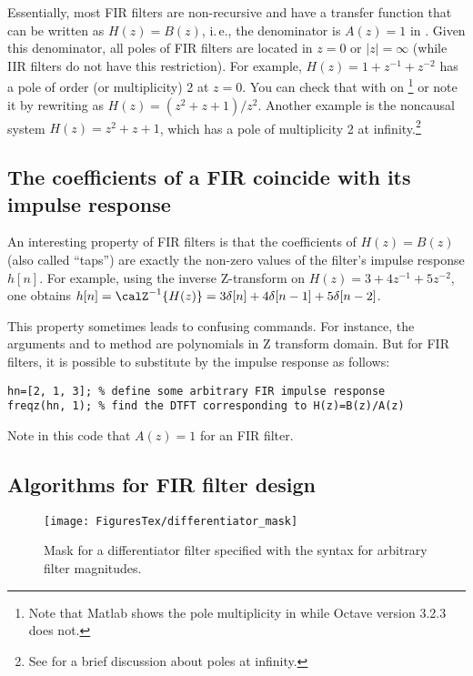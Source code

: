 Essentially, most FIR filters are non-recursive and have a transfer function that can be written as $H(z)=B(z)$, i.\,e., the denominator is $A(z)=1$ in .
Given this denominator, all poles of FIR filters are located in $z=0$ or $|z|=\infty$ (while IIR filters do not have this restriction). For example, $H(z)=1+z^{-1}+z^{-2}$ has a pole of order (or multiplicity) 2 at $z=0$. You can check that with  on {\matlab}\footnote{Note that Matlab shows the pole multiplicity in  while Octave version 3.2.3 does not.} or note it by rewriting as $H(z)=(z^{2}+z+1)/z^2$.
Another example is the noncausal system $H(z)=z^{2}+z+1$, which has a pole of multiplicity 2 at infinity.\footnote{See  for a brief discussion about poles at infinity.} 

\subsection{The coefficients of a FIR coincide with its impulse response}
An interesting property of FIR filters is that the coefficients of $H(z)=B(z)$ (also called ``taps'') are exactly the non-zero values of the filter's impulse response $h[n]$. For example, using the inverse Z-transform on $H(z)=3+4z^{-1}+5z^{-2}$, one obtains $h[n]=\calZ^{-1}\{H(z)\}=3\delta[n]+4\delta[n-1]+5\delta[n-2]$.

This property sometimes leads to confusing commands. For instance, the arguments  and  to method 
are polynomials in Z transform domain. But for FIR filters, it is possible to substitute  by the impulse
response  as follows:
\begin{lstlisting}
hn=[2, 1, 3]; % define some arbitrary FIR impulse response
freqz(hn, 1); % find the DTFT corresponding to H(z)=B(z)/A(z)
\end{lstlisting}
Note in this code that $A(z)=1$ for an FIR filter.

\subsection{Algorithms for FIR filter design}

\begin{figure}
\centering
\texttt{[image: FiguresTex/differentiator\_mask]}
\caption{Mask for a differentiator filter specified with the syntax for arbitrary filter magnitudes.\label{fig:differentiator_mask}}
\end{figure}

